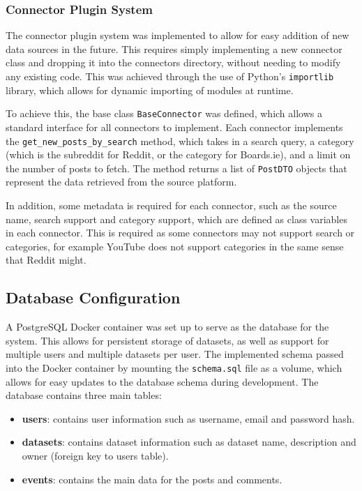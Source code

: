 \documentclass[12pt, a4paper]{article}
\begin{document}
\subsubsection{Connector Plugin System}
The connector plugin system was implemented to allow for easy addition of new data sources in the future. This requires simply implementing a new connector class and dropping it into the connectors directory, without needing to modify any existing code. This was achieved through the use of Python's \texttt{importlib} library, which allows for dynamic importing of modules at runtime.

To achieve this, the base class \texttt{BaseConnector} was defined, which allows a standard interface for all connectors to implement. Each connector implements the \texttt{get\_new\_posts\_by\_search} method, which takes in a search query, a category (which is the subreddit for Reddit, or the category for Boards.ie), and a limit on the number of posts to fetch. The method returns a list of \texttt{PostDTO} objects that represent the data retrieved from the source platform.

In addition, some metadata is required for each connector, such as the source name, search support and category support, which are defined as class variables in each connector. This is required as some connectors may not support search or categories, for example YouTube does not support categories in the same sense that Reddit might.

\subsection{Database Configuration}
A PostgreSQL Docker container was set up to serve as the database for the system. This allows for persistent storage of datasets, as well as support for multiple users and multiple datasets per user. The implemented schema passed into the Docker container by mounting the \texttt{schema.sql} file as a volume, which allows for easy updates to the database schema during development. The database contains three main tables:
\begin{itemize}
    \item \textbf{users}: contains user information such as username, email and password hash.
    \item \textbf{datasets}: contains dataset information such as dataset name, description and owner (foreign key to users table).
    \item \textbf{events}: contains the main data for the posts and comments.
\end{itemize}
\end{document}
